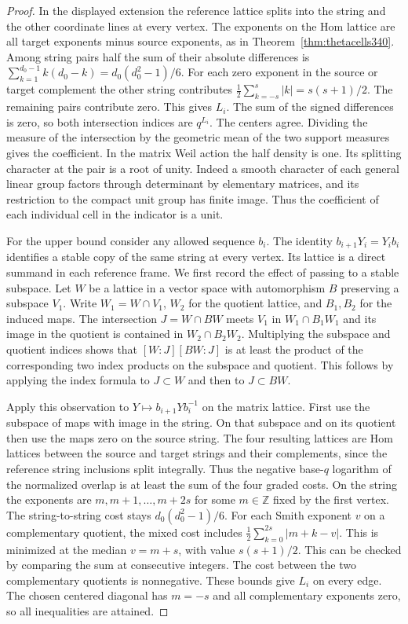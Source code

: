 \documentclass[a4paper,11pt]{article}
\theoremstyle{definition}
\theoremstyle{remark}
\numberwithin{equation}{section}
\begin{document}
\begin{proof}
In the displayed extension the reference lattice splits into the
string and the other coordinate lines at every vertex. The
exponents on the Hom lattice are all target exponents minus source
exponents, as in Theorem~\ref{thm:thetacells340}. Among string pairs
half the sum of their absolute differences is
$\sum_{k=1}^{d_0-1}k(d_0-k)=d_0(d_0^2-1)/6$. For each zero exponent
in the source or target complement the other string contributes
$\tfrac12\sum_{k=-s}^s|k|=s(s+1)/2$. The remaining pairs contribute
zero. This gives $L_i$. The sum of the signed differences is zero,
so both intersection indices are $q^{L_i}$. The centers agree.
Dividing the measure of the intersection by the geometric mean of
the two support measures gives the coefficient. In the matrix Weil
action the half density is one. Its splitting character at the pair
is a root of unity. Indeed a smooth character of each general linear
group factors through determinant by elementary matrices, and its
restriction to the compact unit group has finite image. Thus the
coefficient of each individual cell in the indicator is a unit.

For the upper bound consider any allowed sequence $b_i$. The
identity $b_{i+1}Y_i=Y_i b_i$ identifies a stable copy of the same
string at every vertex. Its lattice is a direct summand in each
reference frame. We first record the effect of passing to a stable
subspace. Let $W$ be a lattice in a vector space with automorphism
$B$ preserving a subspace $V_1$. Write $W_1=W\cap V_1$, $W_2$ for
the quotient lattice, and $B_1,B_2$ for the induced maps. The
intersection $J=W\cap BW$ meets $V_1$ in $W_1\cap B_1W_1$ and
its image in the quotient is contained in $W_2\cap B_2W_2$.
Multiplying the subspace and quotient indices shows that
$[W:J][BW:J]$ is at least the product of the corresponding two
index products on the subspace and quotient. This follows by
applying the index formula to $J\subset W$ and then to $J\subset BW$.

Apply this observation to $Y\mapsto b_{i+1}Yb_i^{-1}$ on the matrix
lattice. First use the subspace of maps with image in the string.
On that subspace and on its quotient then use the maps zero on the
source string. The four resulting lattices are Hom lattices between
the source and target strings and their complements, since the
reference string inclusions split integrally. Thus the negative
base-$q$ logarithm of the normalized overlap is at least the sum
of the four graded costs. On the string the exponents are
$m,m+1,\ldots,m+2s$ for some $m\in\mathbb Z$ fixed by the first
vertex. The string-to-string cost stays $d_0(d_0^2-1)/6$.
For each Smith exponent $v$ on a complementary quotient, the mixed
cost includes $\tfrac12\sum_{k=0}^{2s}|m+k-v|$. This is minimized
at the median $v=m+s$, with value $s(s+1)/2$. This can be checked
by comparing the sum at consecutive integers. The cost between the
two complementary quotients is nonnegative. These bounds give
$L_i$ on every edge. The chosen centered diagonal has $m=-s$ and
all complementary exponents zero, so all inequalities are attained.
\end{proof}
\end{document}
